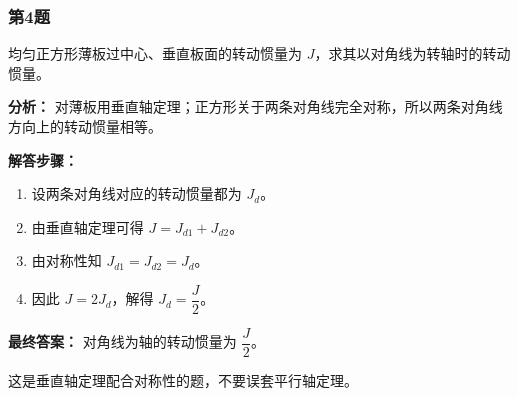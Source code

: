 \documentclass[12pt,a4paper]{ctexart}
\begin{document}
\subsubsection*{第4题}
\begin{tcolorbox}[colback=gray!2!white,colframe=black!60,title={题目}]
均匀正方形薄板过中心、垂直板面的转动惯量为 \(J\)，求其以对角线为转轴时的转动惯量。\par
\end{tcolorbox}
\begin{tcolorbox}[colback=blue!2!white,colframe=blue!55!black,title={完整答案}]
\textbf{分析：}
对薄板用垂直轴定理；正方形关于两条对角线完全对称，所以两条对角线方向上的转动惯量相等。\par
\textbf{解答步骤：}
\begin{enumerate}
\item 设两条对角线对应的转动惯量都为 \(J_d\)。
\item 由垂直轴定理可得 \(J=J_{d1}+J_{d2}\)。
\item 由对称性知 \(J_{d1}=J_{d2}=J_d\)。
\item 因此 \(J=2J_d\)，解得 \(J_d=\dfrac{J}{2}\)。
\end{enumerate}
\textbf{最终答案：}
对角线为轴的转动惯量为 \(\dfrac{J}{2}\)。\par
\end{tcolorbox}
\begin{tcolorbox}[colback=red!2!white,colframe=red!55!black,title={易错点}]
这是垂直轴定理配合对称性的题，不要误套平行轴定理。\par
\end{tcolorbox}
\end{document}
